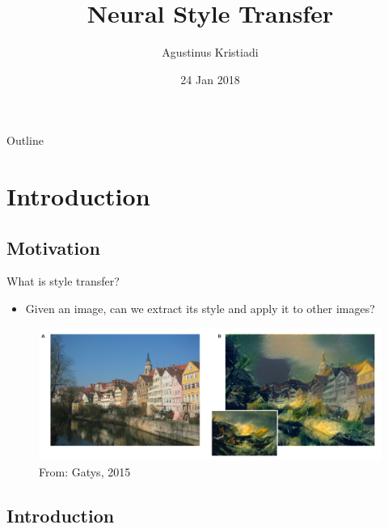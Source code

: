 \documentclass{beamer}
\title[Neural Style Transfer]{Neural Style Transfer}
\author{Agustinus Kristiadi}
\institute{University of Bonn}
\date{24 Jan 2018}
\begin{document}
    \begin{frame}
      \titlepage
    \end{frame}

    \begin{frame}{Outline}
     \tableofcontents
    \end{frame}


    \section{Introduction}

    \subsection{Motivation}

    \begin{frame}{What is style transfer?}

    \begin{itemize}
        \item Given an image, can we extract its style and apply it to other images?
    \end{itemize}

    \begin{figure}
        \includegraphics[width=\textwidth]{styletransfer}
        \caption{\label{fig:styletransfer}From: Gatys, 2015}
    \end{figure}

    \end{frame}

    \subsection{Introduction}
\end{document}

